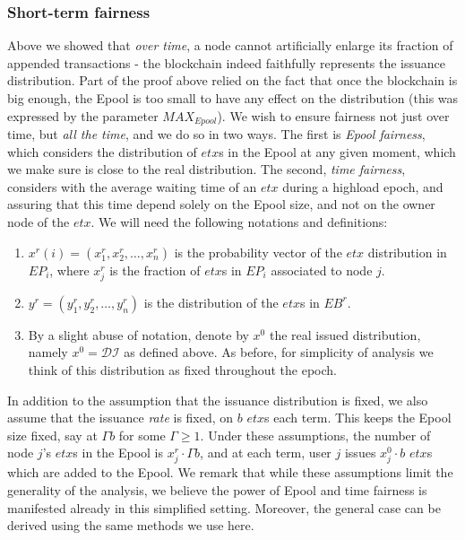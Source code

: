 \subsubsection*{Short-term fairness}
Above we showed that \emph{over time}, a node cannot artificially enlarge its fraction of appended transactions - the blockchain indeed faithfully represents the issuance distribution. Part of the proof above relied on the fact that once the blockchain is big enough, the Epool is too small to have any effect on the distribution (this was expressed by the parameter $MAX_{Epool}$). We wish to ensure fairness not just over time, but \emph{all the time}, and we do so in two ways. The first is \textit{Epool fairness}, which considers the distribution of $etx$s in the Epool at any given moment, which we make sure is close to the real distribution. The second, \textit{time fairness}, considers with the average waiting time of an $etx$ during a highload epoch, and assuring that this time depend solely on the Epool size, and not on the owner node of the $etx$. We will need the following notations and definitions: 
\begin{enumerate}
	\item $x^r(i)=(x^r_1,x^r_2,\dots,x^r_n)$ is the probability vector of the $etx$ distribution in $EP_i$, where $x^r_j$ is the fraction of $etx$s in  $EP_i$ associated to node $j$.
	\item $y^r=(y^r_1,y^r_2,\dots,y^r_n)$ is the distribution of the $etx$s in $EB^r$.

	\item By a slight abuse of notation, denote by $x^0$ the real issued distribution, namely $x^0=\mathcal{DI}$ as defined above. As before, for simplicity of analysis we think of this distribution as fixed throughout the epoch.
\end{enumerate}
In addition to the assumption that the issuance distribution is fixed, we also assume that the issuance \emph{rate} is fixed, on $b$ $etx$s each term. This keeps the Epool size fixed, say at $\Gamma b$ for some $\Gamma\geq 1$. Under these assumptions, the number of node $j$'s $etx$s in the Epool is $x^r_j\cdot \Gamma b$, and at each term, user $j$ issues $x^0_j\cdot b$ $etx$s which are added to the Epool.  We remark that while these assumptions limit the generality of the analysis, we believe the power of Epool and time fairness is manifested already in this simplified setting. Moreover, the general case can be derived using the same methods we use here.

